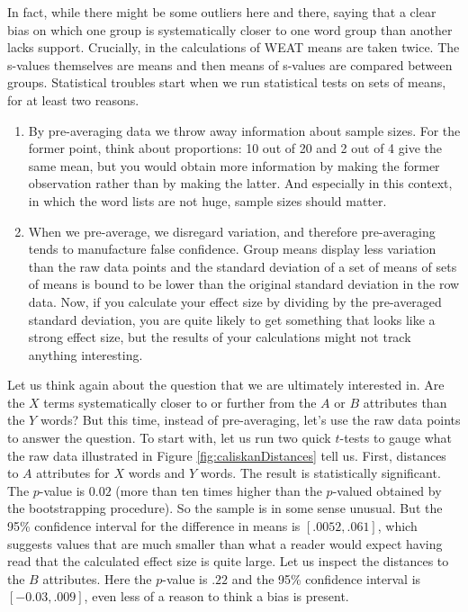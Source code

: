\documentclass{clv3}
\begin{document}
\noindent In fact, while there might be some outliers here and there,
saying that a clear bias on which one group is systematically closer to
one word group  than another lacks support.  Crucially, in the calculations of \textsf{WEAT} means are taken twice. The \textsf{s}-values themselves are means and then means of \textsf{s}-values are compared between groups. Statistical troubles
start when we run statistical tests on sets of means, for at least two
reasons.

\begin{enumerate}

\item By pre-averaging data we throw away information about sample sizes. For the former point, think about proportions: 10 out of 20 and 2 out of 4 give the same mean, but you would obtain more information by making the former observation rather than by making the latter.  And especially in this context, in which the word lists are not huge, sample sizes should matter.

\item When we pre-average, we disregard variation, and therefore pre-averaging  tends to manufacture false confidence. Group means display less variation than the raw data points and the standard deviation of a set of means of sets of means is bound to be lower than the original standard deviation in the row data. Now, if you calculate your effect size by dividing by the pre-averaged standard deviation, you are quite likely to get something that looks like a strong effect size, but the results of your calculations might not track anything interesting.
\end{enumerate}

Let us think again about the question that we are ultimately interested
in.  Are the \(X\) terms systematically closer to or further from the
\(A\)  or \(B\) attributes than the \(Y\) words?  But this time, instead of pre-averaging, let's use the raw data points to answer the question. To start with, let us run two quick \(t\)-tests to gauge what the raw
data illustrated in Figure \ref{fig:caliskanDistances} tell us. First,
distances to \(A\) attributes for \(X\) words and \(Y\) words. The
result is statistically significant. The
\(p\)-value is \(0.02\) (more than ten times higher than the
\(p\)-valued obtained by the bootstrapping procedure). So the sample is
in some sense unusual. But the 95\% confidence interval for the
difference in means is \([.0052, .061]\), which suggests values that are much smaller  than what a reader  would expect having read that the calculated effect size is quite large. Let us inspect the distances to the \(B\) attributes. Here the \(p\)-value is
\(.22\) and the 95\% confidence interval is \([-0.03, .009]\), even less
of a reason to think a bias is present.
\end{document}
